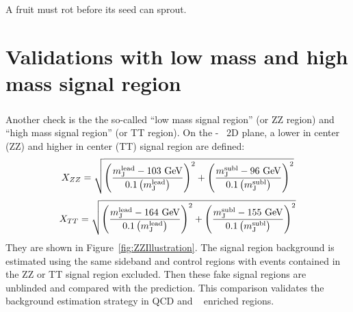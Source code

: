 \begin{savequote}[75mm]
A fruit must rot before its seed can sprout.   
\end{savequote}
\chapter{Validations with low mass and high mass signal region}
\label{app:appendixZZ}

\paragraph{}
Another check is the the so-called ``low mass signal region'' (or ZZ region) and ``high mass signal region'' (or TT region). 
On the \mleadJ-\msublJ~ 2D plane, a lower in center (ZZ) and higher in center (TT) signal region are defined: 
\begin{equation}
X_{ZZ} = \sqrt{\left(\frac{m^{\rm lead}_{\rm J} - \text{103 GeV}}{0.1 \left(m^{\rm lead}_{\rm J}\right)}\right)^2 + \left(\frac{m^{\rm subl}_{\rm J}- \text{96 GeV}}{0.1 \left(m^{\rm subl}_{\rm J}\right)}\right)^2}
\label{eq:boosted_Xzz}
\end{equation}
\begin{equation}
X_{TT} = \sqrt{\left(\frac{m^{\rm lead}_{\rm J} - \text{164 GeV}}{0.1 \left(m^{\rm lead}_{\rm J}\right)}\right)^2 + \left(\frac{m^{\rm subl}_{\rm J}- \text{155 GeV}}{0.1 \left(m^{\rm subl}_{\rm J}\right)}\right)^2}
\label{eq:boosted_Xtt}
\end{equation}
They are shown in Figure~\ref{fig:ZZIllustration}. 
The signal region background is estimated using the same sideband and control regions with events contained in the ZZ or TT signal region excluded. 
Then these fake signal regions are unblinded and compared with the prediction. 
This comparison validates the background estimation strategy in QCD and \ttbar~ enriched regions.

